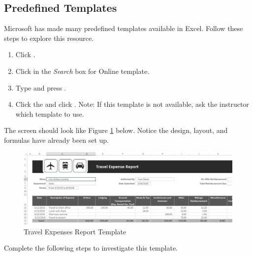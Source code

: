 \subsection{Predefined Templates}

Microsoft has made many predefined templates available in Excel. Follow these steps to explore this resource.

\begin{enumbox}
	\begin{enumerate}
		\item Click .
		\item Click in the \textit{Search} box for Online template.
		\item Type  and press .
		\item Click the  and click . Note: If this template is not available, ask the instructor which template to use.
	\end{enumerate}
\end{enumbox}

The screen should look like Figure \ref{06:fig09} below. Notice the design, layout, and formulas have already been set up.

\begin{figure}[H]
	\centering
	\includegraphics[width=\maxwidth{.95\linewidth}]{gfx/ch06_fig09}
	\caption{Travel Expenses Report Template}
	\label{06:fig09}
\end{figure}

Complete the following steps to investigate this template.

